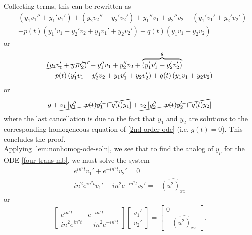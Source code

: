 \documentclass[12pt,reqno]{amsart}
\numberwithin{equation}{section}  %
\numberwithin{figure}{section}
\newcommand{\wh}{\widehat}
\theoremstyle{plain}
\theoremstyle{definition}
\theoremstyle{remark}
\begin{document}
%
Collecting terms, this can be rewritten as
%
%
%
%
\begin{equation*}
\begin{split}
  & (y_{1}v_{1}'' + y_{1}' v_{1}') + (y_{2}v_{2}'' + y_{2}' v_{2}') + y_{1}''
  v_{1} + y_{2}'' v_{2} + (y_{1}'v_{1}' + y_{2}' v_{2}')
  \\
  & + p(t)\left(
  y_{1}'v_{1} + y_{2}' v_{2} + y_{1}v_{1}' + y_{2}v_{2}'
  \right) + q(t)\left( y_{1}v_{1} + y_{2}v_{2} \right)
  \end{split}
\end{equation*}
%
or
%
%
%
%
\begin{equation*}
\begin{split}
  & \cancel{(y_{1}v_{1}' + y_{2}v_{2}')'} + y_{1}''
  v_{1} + y_{2}'' v_{2} + \overbrace{(y_{1}'v_{1}' + y_{2}' v_{2}')}^{g}
  \\
  & + p(t)\left(
  y_{1}'v_{1} + y_{2}' v_{2} + y_{1}v_{1}' + y_{2}v_{2}'
  \right) + q(t)\left( y_{1}v_{1} + y_{2}v_{2} \right)
  \end{split}
\end{equation*}
%
%
or
%
%
\begin{equation*}
\begin{split}
  g + \cancel{v_{1}\left[ y_{1}'' + p(t)y_{1}' + q(t)y_{1} \right]} +
  \cancel{v_{2}\left[ y_{2}'' + p(t)y_{2}' + q(t)y_{2}
  \right]}
\end{split}
\end{equation*}
%
%
where the last cancellation is due to the fact that $y_{1}$ and $y_{2}$ are
solutions to the corresponding homogeneous equation of \eqref{2nd-order-ode}
(i.e. $g(t) = 0$). This concludes the proof. \qquad \qedsymbol
%
%
\\
Applying \autoref{lem:nonhomog-ode-soln}, we see that to find the analog of
$y_p$ for the ODE \eqref{four-trans-mb}, we must solve the system
%
%
\begin{gather*}
  e^{in^{2}t}v_{1}' + e^{-in^{2}t}v_{2}'=0
  \\
  in^{2}e^{in^{2}t}v_{1}' - in^{2}e^{-in^{2}t}v_{2}' = -\wh{(u^{2})_{xx}}
\end{gather*}
%
%
or
\begin{gather*}
    \begin{bmatrix}
      e^{in^{2}t} & e^{-in^{2}t}\\
      in^{2}e^{in^{2}t} & -in^{2}e^{-in^{2}t}
    \end{bmatrix}
    \begin{bmatrix}
      v_{1}' \\
      v_{2}'
    \end{bmatrix}
    =
    \begin{bmatrix}
    0\\
    -\wh{(u^{2})_{xx}}
    \end{bmatrix}.
\end{gather*}
\end{document}
